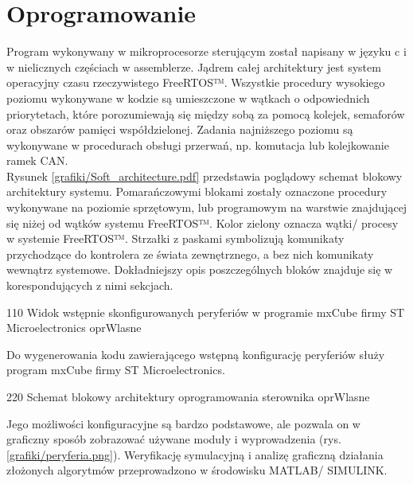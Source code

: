 \section{Oprogramowanie}
\label{s:oprogramowanie}

Program wykonywany w mikroprocesorze sterującym został napisany w języku c i w nielicznych częściach w assemblerze. Jądrem całej architektury jest system operacyjny czasu rzeczywistego FreeRTOS™. Wszystkie procedury wysokiego poziomu wykonywane w kodzie są umieszczone w wątkach o odpowiednich priorytetach, które porozumiewają się między sobą za pomocą kolejek, semaforów oraz obszarów pamięci współdzielonej. Zadania najniższego poziomu są wykonywane w procedurach obsługi przerwań, np. komutacja lub kolejkowanie ramek CAN. \\

Rysunek \ref{grafiki/Soft_architecture.pdf} przedstawia poglądowy schemat blokowy architektury systemu. Pomarańczowymi blokami zostały oznaczone procedury wykonywane na poziomie sprzętowym, lub programowym na warstwie znajdującej się niżej od wątków systemu FreeRTOS™. Kolor zielony oznacza wątki/ procesy w systemie FreeRTOS™. Strzałki z paskami symbolizują komunikaty przychodzące do kontrolera ze świata zewnętrznego, a bez nich komunikaty wewnątrz systemowe. Dokładniejszy opis poszczególnych bloków znajduje się w korespondujących z nimi sekcjach.

	{110}
	{Widok wstępnie skonfigurowanych peryferiów w programie mxCube firmy ST Microelectronics}
	{oprWlasne}
	
Do wygenerowania kodu zawierającego wstępną konfigurację peryferiów służy program mxCube firmy ST Microelectronics.
	
	{220}
	{Schemat blokowy architektury oprogramowania sterownika}
	{oprWlasne}
	
\clearpage

Jego możliwości konfiguracyjne są bardzo podstawowe, ale pozwala on w graficzny sposób zobrazować używane moduły i wyprowadzenia (rys. \ref{grafiki/peryferia.png}). Weryfikację symulacyjną i analizę graficzną działania złożonych algorytmów przeprowadzono w środowisku MATLAB/ SIMULINK.













\clearpage
















\clearpage